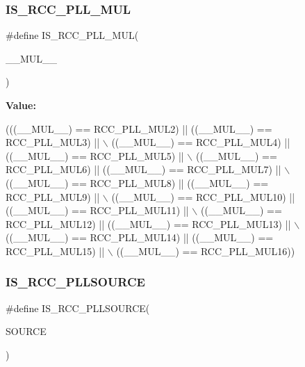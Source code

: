 \subsubsection{\texorpdfstring{I\+S\+\_\+\+R\+C\+C\+\_\+\+P\+L\+L\+\_\+\+M\+UL}{IS\_RCC\_PLL\_MUL}}
{\footnotesize\ttfamily \#define I\+S\+\_\+\+R\+C\+C\+\_\+\+P\+L\+L\+\_\+\+M\+UL(\begin{DoxyParamCaption}\item[{}]{\+\_\+\+\_\+\+M\+U\+L\+\_\+\+\_\+ }\end{DoxyParamCaption})}

{\bfseries Value\+:}
\begin{DoxyCode}
(((\_\_MUL\_\_) == RCC\_PLL\_MUL2)  || ((\_\_MUL\_\_) == RCC\_PLL\_MUL3)   || \(\backslash\)
                                 ((\_\_MUL\_\_) == RCC\_PLL\_MUL4)  || ((\_\_MUL\_\_) == RCC\_PLL\_MUL5)   || \(\backslash\)
                                 ((\_\_MUL\_\_) == RCC\_PLL\_MUL6)  || ((\_\_MUL\_\_) == RCC\_PLL\_MUL7)   || \(\backslash\)
                                 ((\_\_MUL\_\_) == RCC\_PLL\_MUL8)  || ((\_\_MUL\_\_) == RCC\_PLL\_MUL9)   || \(\backslash\)
                                 ((\_\_MUL\_\_) == RCC\_PLL\_MUL10) || ((\_\_MUL\_\_) == RCC\_PLL\_MUL11)  || \(\backslash\)
                                 ((\_\_MUL\_\_) == RCC\_PLL\_MUL12) || ((\_\_MUL\_\_) == RCC\_PLL\_MUL13)  || \(\backslash\)
                                 ((\_\_MUL\_\_) == RCC\_PLL\_MUL14) || ((\_\_MUL\_\_) == RCC\_PLL\_MUL15)  || \(\backslash\)
                                 ((\_\_MUL\_\_) == RCC\_PLL\_MUL16))
\end{DoxyCode}
\mbox{\label{group___r_c_c___private___macros_gae1aef66aae2c0374be3c7c62d389282f}} 
\subsubsection{\texorpdfstring{I\+S\+\_\+\+R\+C\+C\+\_\+\+P\+L\+L\+S\+O\+U\+R\+CE}{IS\_RCC\_PLLSOURCE}}
{\footnotesize\ttfamily \#define I\+S\+\_\+\+R\+C\+C\+\_\+\+P\+L\+L\+S\+O\+U\+R\+CE(\begin{DoxyParamCaption}\item[{}]{S\+O\+U\+R\+CE }\end{DoxyParamCaption})}

